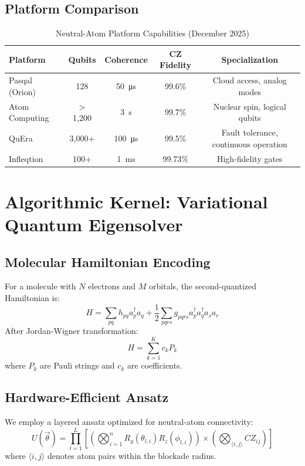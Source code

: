 \documentclass[12pt]{article}
\begin{document}
\subsection{Platform Comparison}

\begin{table}[H]
\centering
\caption{Neutral-Atom Platform Capabilities (December 2025)}
\begin{tabular}{lcccc}
\toprule
\textbf{Platform} & \textbf{Qubits} & \textbf{Coherence} & \textbf{CZ Fidelity} & \textbf{Specialization} \\
\midrule
Pasqal (Orion) & 128 & \SI{50}{\micro\second} & 99.6\% & Cloud access, analog modes \\
Atom Computing & $>$1,200 & \SI{3}{\second} & 99.7\% & Nuclear spin, logical qubits \\
QuEra & 3,000+ & \SI{100}{\micro\second} & 99.5\% & Fault tolerance, continuous operation \\
Infleqtion & 100+ & \SI{1}{\milli\second} & 99.73\% & High-fidelity gates \\
\bottomrule
\end{tabular}
\end{table}

\section{Algorithmic Kernel: Variational Quantum Eigensolver}

\subsection{Molecular Hamiltonian Encoding}
For a molecule with $N$ electrons and $M$ orbitals, the second-quantized Hamiltonian is:
\begin{equation}
H = \sum_{pq} h_{pq} a_p^\dagger a_q + \frac{1}{2} \sum_{pqrs} g_{pqrs} a_p^\dagger a_q^\dagger a_s a_r
\end{equation}
After Jordan-Wigner transformation:
\begin{equation}
H = \sum_{k=1}^K c_k P_k
\end{equation}
where $P_k$ are Pauli strings and $c_k$ are coefficients.

\subsection{Hardware-Efficient Ansatz}
We employ a layered ansatz optimized for neutral-atom connectivity:
\begin{equation}
U(\vec{\theta}) = \prod_{l=1}^L \left[ \left( \bigotimes_{i=1}^n R_y(\theta_{l,i})R_z(\phi_{l,i}) \right) \times \left( \bigotimes_{\langle i,j \rangle} CZ_{ij} \right) \right]
\end{equation}
where $\langle i,j \rangle$ denotes atom pairs within the blockade radius.
\end{document}
